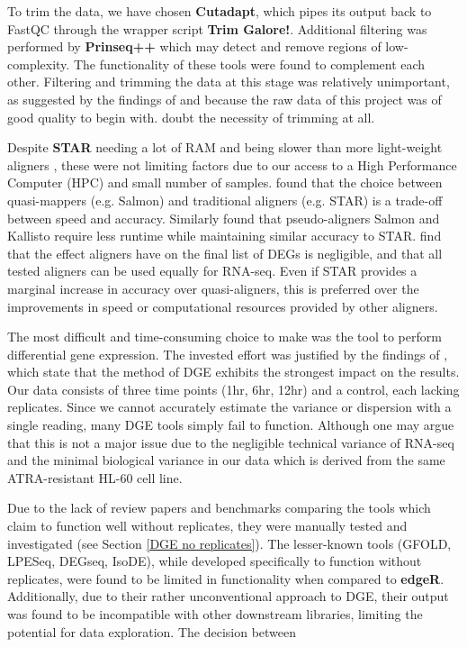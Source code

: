 To trim the data, we have chosen \textbf{Cutadapt}, which pipes its output back to FastQC through the wrapper script \textbf{Trim Galore!}. Additional filtering was performed by \textbf{Prinseq++} which may detect and remove regions of low-complexity. The functionality of these tools were found to complement each other. Filtering and trimming the data at this stage was relatively unimportant, as suggested by the findings of \cite{he2020assessing} and because the raw data of this project was of good quality to begin with. \cite{liao2020read} doubt the necessity of trimming at all.

Despite \textbf{STAR} needing a lot of RAM \citep{Dobin2013} and being slower than more light-weight aligners \citep{srivastava2020alignment}, these were not limiting factors due to our access to a High Performance Computer (HPC) and small number of samples. \cite{srivastava2020alignment} found that the choice between quasi-mappers (e.g. Salmon) and traditional aligners (e.g. STAR) is a trade-off between speed and accuracy. Similarly \cite{Zhang2017} found that pseudo-aligners Salmon and Kallisto require less runtime while maintaining similar accuracy to STAR. \cite{Schaarschmidt2020} find that the effect aligners have on the final list of \ac{DEG}s is negligible, and that all tested aligners can be used equally for RNA-seq. Even if STAR provides a marginal increase in accuracy over quasi-aligners, this is preferred over the improvements in speed or computational resources provided by other aligners.

The most difficult and time-consuming choice to make was the tool to perform differential gene expression. The invested effort was justified by the findings of \cite{williams2017empirical}, which state that the method of \ac{DGE} exhibits the strongest impact on the results. Our data consists of three time points (1hr, 6hr, 12hr) and a control, each lacking replicates. Since we cannot accurately estimate the variance or dispersion with a single reading, many \ac{DGE} tools simply fail to function. Although one may argue that this is not a major issue due to the negligible technical variance of RNA-seq \citep{bullard2010evaluation} and the minimal biological variance in our data which is derived from the same \ac{ATRA}-resistant HL-60 cell line.

Due to the lack of review papers and benchmarks comparing the tools which claim to function well without replicates, they were manually tested and investigated (see Section \ref{DGE no replicates}). The lesser-known tools (GFOLD, LPESeq, DEGseq, IsoDE), while developed specifically to function without replicates, were found to be limited in functionality when compared to \textbf{edgeR}. Additionally, due to their rather unconventional approach to \ac{DGE}, their output was found to be incompatible with other downstream libraries, limiting the potential for data exploration. The decision between 

